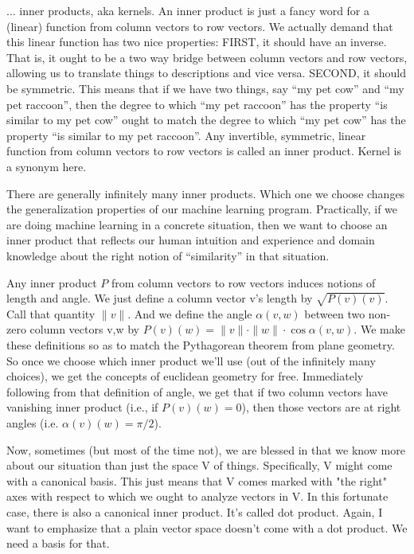         ... inner products, aka kernels.  An inner product is just a fancy word
        for a (linear) function from column vectors to row vectors.  We
        actually demand that this linear function has two nice properties:
        FIRST, it should have an inverse.  That is, it ought to be a two way
        bridge between column vectors and row vectors, allowing us to translate
        things to descriptions and vice versa.  SECOND, it should be symmetric.
        This means that if we have two things, say ``my pet cow'' and ``my pet
        raccoon'', then the degree to which ``my pet raccoon'' has the property
        ``is similar to my pet cow'' ought to match the degree to which ``my pet
        cow'' has the property ``is similar to my pet raccoon''.  Any invertible,
        symmetric, linear function from column vectors to row vectors is called
        an inner product.  Kernel is a synonym here.

        There are generally infinitely many inner products.  Which one we
        choose changes the generalization properties of our machine learning
        program.  Practically, if we are doing machine learning in a concrete
        situation, then we want to choose an inner product that reflects our
        human intuition and experience and domain knowledge about the right
        notion of ``similarity'' in that situation.

        Any inner product $P$ from column vectors to row vectors induces notions
        of length and angle.  We just define a column vector v's length by
        $\sqrt{P(v)(v)}$.  Call that quantity $\|v\|$.  And we define the angle
        $\alpha(v,w)$ between two non-zero column vectors v,w by
        $P(v)(w)=\|v\|\cdot\|w\|\cdot\cos\alpha(v,w)$.  We make these
        definitions so as to match the Pythagorean theorem from plane geometry.
        So once we choose which inner product we'll use (out of the infinitely
        many choices), we get the concepts of euclidean geometry for free.
        Immediately following from that definition of angle, we get that if two
        column vectors have vanishing inner product (i.e., if $P(v)(w)=0$), then
        those vectors are at right angles (i.e. $\alpha(v)(w)=\pi/2$).

        Now, sometimes (but most of the time not), we are blessed in
        that we know more about our situation than just the space V of things.
        Specifically, V might come with a canonical basis.  This just means
        that V comes marked with "the right" axes with respect to which we
        ought to analyze vectors in V.  In this fortunate case, there is also a
        canonical inner product.  It's called dot product.  Again, I want to
        emphasize that a plain vector space doesn't come with a dot product.
        We need a basis for that.

